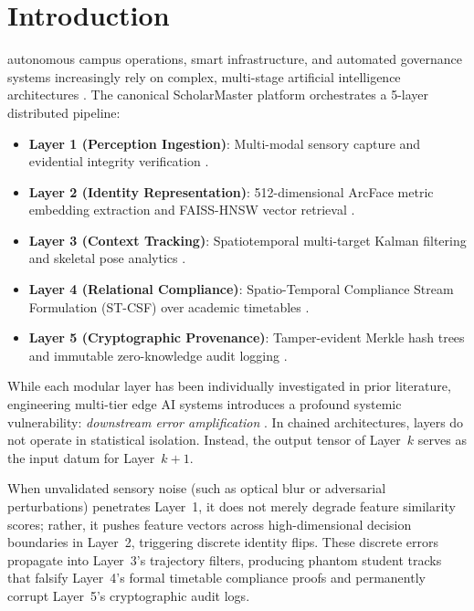 \documentclass[10pt,journal,compsoc]{IEEEtran}
\begin{document}
\section{Introduction}
 autonomous campus operations, smart infrastructure, and automated governance systems increasingly rely on complex, multi-stage artificial intelligence architectures \cite{shi2016edge, zhou2019edge}. The canonical ScholarMaster platform orchestrates a 5-layer distributed pipeline:
\begin{itemize}
    \item \textbf{Layer 1 (Perception Ingestion)}: Multi-modal sensory capture and evidential integrity verification \cite{kumar2026scholar22}.
    \item \textbf{Layer 2 (Identity Representation)}: 512-dimensional ArcFace metric embedding extraction and FAISS-HNSW vector retrieval \cite{deng2019arcface, malkov2020efficient}.
    \item \textbf{Layer 3 (Context Tracking)}: Spatiotemporal multi-target Kalman filtering and skeletal pose analytics \cite{cao2019openpose, kumar2026scholar24}.
    \item \textbf{Layer 4 (Relational Compliance)}: Spatio-Temporal Compliance Stream Formulation (ST-CSF) over academic timetables \cite{kumar2026scholar1}.
    \item \textbf{Layer 5 (Cryptographic Provenance)}: Tamper-evident Merkle hash trees and immutable zero-knowledge audit logging \cite{merkle1987digital}.
\end{itemize}

While each modular layer has been individually investigated in prior literature, engineering multi-tier edge AI systems introduces a profound systemic vulnerability: \textit{downstream error amplification} \cite{sambasivan2021everyone, sculley2015hidden}. In chained architectures, layers do not operate in statistical isolation. Instead, the output tensor of Layer~$k$ serves as the input datum for Layer~$k+1$. 

When unvalidated sensory noise (such as optical blur or adversarial perturbations) penetrates Layer~1, it does not merely degrade feature similarity scores; rather, it pushes feature vectors across high-dimensional decision boundaries in Layer~2, triggering discrete identity flips. These discrete errors propagate into Layer~3's trajectory filters, producing phantom student tracks that falsify Layer~4's formal timetable compliance proofs and permanently corrupt Layer~5's cryptographic audit logs.
\end{document}

